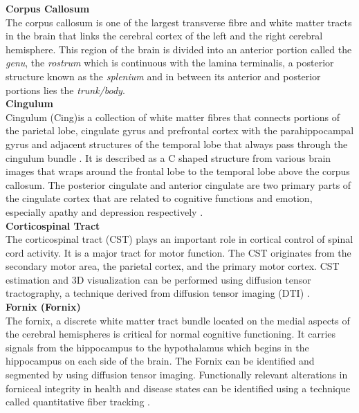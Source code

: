 \documentclass[../structure.tex]{subfiles}
\begin{document}
	\textbf{Corpus Callosum } \\
	The corpus callosum is one of the largest transverse fibre and white matter tracts in the brain that links the cerebral cortex of the left and the right cerebral hemisphere. This region of the brain is divided into an anterior portion called the \textit{genu}, the \textit{rostrum} which is continuous with the lamina terminalis, a posterior structure known as the \textit{splenium} and in between its anterior and posterior portions lies the \textit{trunk/body}.\\


		\textbf{Cingulum}  \\
		Cingulum (Cing)is a collection of white matter fibres that connects portions of the parietal lobe, cingulate gyrus and prefrontal cortex with the parahippocampal gyrus and adjacent structures of the temporal lobe that always pass through the cingulum bundle  \cite{Washington1994}. It is described as a C shaped structure from various brain images that wraps around the frontal lobe to the temporal lobe above the corpus callosum. The posterior cingulate and anterior cingulate are two primary parts of the cingulate cortex that are related to cognitive functions and emotion,  especially apathy and depression respectively \cite{JaredTanner2010}.\\
		
		
	\textbf{Corticospinal Tract } \\	
		The corticospinal tract (CST) plays an important role in cortical control of spinal cord activity. It is a major tract for motor function. The CST originates from the secondary motor area, the parietal cortex, and the primary motor cortex. CST estimation and 3D visualization can be performed using diffusion tensor tractography, a technique derived from diffusion tensor imaging (DTI) \cite{Seo2013}.\\
		
		
		\textbf{Fornix (Fornix)} \\		
	The fornix, a discrete white matter tract bundle located on the medial aspects of the cerebral hemispheres is critical for normal cognitive functioning. It carries signals from the hippocampus to the hypothalamus which begins in the hippocampus on each side of the brain. The Fornix can be identified and segmented by using diffusion tensor imaging. Functionally relevant alterations in forniceal integrity in health and disease states can be identified using a technique called quantitative fiber tracking \cite{Thomas2011}.\\
\end{document}
